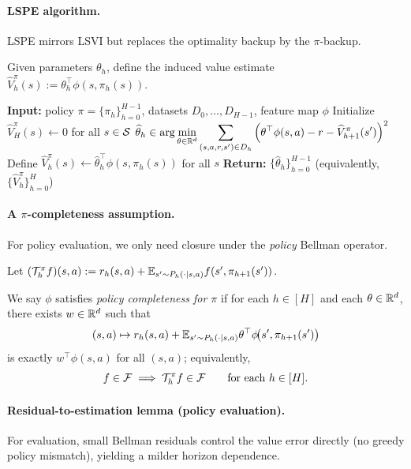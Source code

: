 \paragraph{LSPE algorithm.}
LSPE mirrors LSVI but replaces the optimality backup by the $\pi$-backup.

Given parameters $\theta_h$, define the induced value estimate
$\widehat V_h^\pi(s):=\theta_h^\top\phi(s,\pi_h(s))$.

\begin{algorithm}[t]
\begin{algorithmic}[1]
\State \textbf{Input:} policy $\pi=\{\pi_h\}_{h=0}^{H-1}$, datasets $D_0,\dots,D_{H-1}$, feature map $\phi$
\State Initialize $\widehat V^\pi_{H}(s) \gets 0$ for all $s\in\mathcal{S}$
    \State $\displaystyle
    \widehat\theta_{h}
    \in \arg\min_{\theta\in\mathbb{R}^d}
    \sum_{(s,a,r,s')\in D_h}
    \Big(\theta^\top\phi(s,a) - r - \widehat V^\pi_{h+1}(s')\Big)^2$
    \State Define $\widehat V^\pi_h(s) \gets \widehat\theta_h^\top\phi(s, \pi_h(s))$ for all $s$
\EndFor
\State \textbf{Return:} $\{\widehat\theta_h\}_{h=0}^{H-1}$ (equivalently, $\{\widehat V_h^\pi\}_{h=0}^{H}$)
\end{algorithmic}
\caption{Least-Squares Policy Evaluation (LSPE)}
\label{alg:lspe}
\end{algorithm}

\paragraph{A $\pi$-completeness assumption.}
For policy evaluation, we only need closure under the \emph{policy} Bellman operator.

Let $(\mathcal{T}_h^\pi f)(s,a):= r_h(s,a) + \mathbb{E}_{s'\sim P_h(\cdot\mid s,a)} f(s',\pi_{h+1}(s'))$.

\begin{definition}\label{def:pi_completeness}
We say $\phi$ satisfies \emph{policy completeness for $\pi$} if for each $h\in[H]$
and each $\theta\in\mathbb{R}^d$, there exists $w\in\mathbb{R}^d$ such that
\[
(s,a)\mapsto r_h(s,a) + \mathbb{E}_{s'\sim P_h(\cdot\mid s,a)} \theta^\top\phi\!\bigl(s',\pi_{h+1}(s')\bigr)
\]
is exactly $w^\top\phi(s,a)$ for all $(s,a)$; equivalently,
\[
f\in\mathcal{F} \implies \mathcal{T}_h^\pi f \in \mathcal{F}\qquad\text{for each }h\in[H].
\]
\end{definition}

\paragraph{Residual-to-estimation lemma (policy evaluation).}
For evaluation, small Bellman residuals control the value error directly (no greedy
policy mismatch), yielding a milder horizon dependence.

